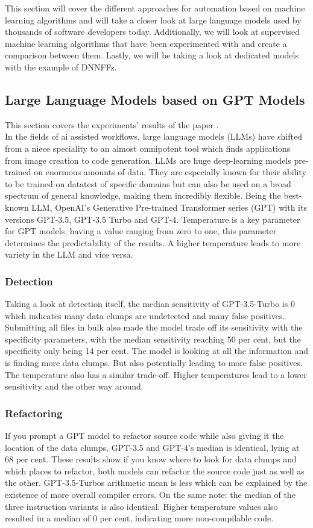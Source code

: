 This section will cover the different approaches for automation based on machine learning algorithms and will take a closer look at large language models used by thousands of software developers today. Additionally, we will look at supervised machine learning algorithms that have been experimented with and create a comparison between them. Lastly, we will be taking a look at dedicated models with the example of DNNFFz.
\subsection{Large Language Models based on GPT Models}
This section covers the experiments' results of the paper \cite[AI-Driven Refactoring: A Pipeline for Identifying and Correcting Data Clumps in Git Repositories]{baumgartner2024aidriven}.\\
In the fields of ai assisted workflows, large language models (LLMs) have shifted from a niece speciality to an almost omnipotent tool which finds applications from image creation to code generation.\cite{meyer2024ai} LLMs are huge deep-learning models pre-trained on enormous amounts of data. They are especially known for their ability to be trained on datatest of specific domains but can also be used on a broad spectrum of general knowledge, making them incredibly flexible. \cite{baumgartner2024aidriven}
Being the best-known LLM, OpenAI's Generative Pre-trained Transformer series (GPT) with its versions GPT-3.5, GPT-3.5 Turbo and GPT-4.
Temperature is a key parameter for GPT models, having a value ranging from zero to one, this parameter determines the predictability of the results. 
A higher temperature leads to more variety in the LLM and vice versa.
\subsubsection{Detection}
Taking a look at detection itself, the median sensitivity of GPT-3.5-Turbo is 0 which indicates many data clumps are undetected and many false positives.
Submitting all files in bulk also made the model trade off its sensitivity with the specificity parameters, with the median sensitivity reaching 50 per cent, but the specificity only being 14 per cent. 
The model is looking at all the information and is finding more data clumps. But also potentially leading to more false positives.
The temperature also has a similar trade-off. Higher temperatures lead to a lower sensitivity and the other way around.
\subsubsection{Refactoring}
If you prompt a GPT model to refactor source code while also giving it the location of the data clumps, GPT-3.5 and GPT-4's median is identical, lying at 68 per cent.
These results show if you know where to look for data clumps and which places to refactor, both models can refactor the source code just as well as the other.
GPT-3.5-Turbos arithmetic mean is less which can be explained by the existence of more overall compiler errors.
On the same note: the median of the three instruction variants is also identical.
Higher temperature values also resulted in a median of 0 per cent, indicating more non-compilable code.
